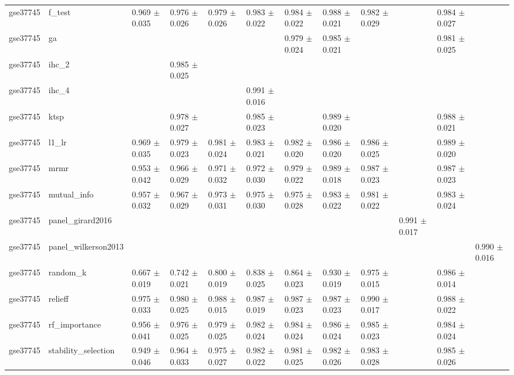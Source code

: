 \begin{table}[t]
\begin{tabular}{llllllllllll}
    gse37745 & f\_test & 0.969 $\pm$ 0.035 & 0.976 $\pm$ 0.026 & 0.979 $\pm$ 0.026 & 0.983 $\pm$ 0.022 & 0.984 $\pm$ 0.022 & 0.988 $\pm$ 0.021 & 0.982 $\pm$ 0.029 &  & 0.984 $\pm$ 0.027 &  \\
    gse37745 & ga &  &  &  &  & 0.979 $\pm$ 0.024 & 0.985 $\pm$ 0.021 &  &  & 0.981 $\pm$ 0.025 &  \\
    gse37745 & ihc\_2 &  & 0.985 $\pm$ 0.025 &  &  &  &  &  &  &  &  \\
    gse37745 & ihc\_4 &  &  &  & 0.991 $\pm$ 0.016 &  &  &  &  &  &  \\
    gse37745 & ktsp &  & 0.978 $\pm$ 0.027 &  & 0.985 $\pm$ 0.023 &  & 0.989 $\pm$ 0.020 &  &  & 0.988 $\pm$ 0.021 &  \\
    gse37745 & l1\_lr & 0.969 $\pm$ 0.035 & 0.979 $\pm$ 0.023 & 0.981 $\pm$ 0.024 & 0.983 $\pm$ 0.021 & 0.982 $\pm$ 0.020 & 0.986 $\pm$ 0.020 & 0.986 $\pm$ 0.025 &  & 0.989 $\pm$ 0.020 &  \\
    gse37745 & mrmr & 0.953 $\pm$ 0.042 & 0.966 $\pm$ 0.029 & 0.971 $\pm$ 0.032 & 0.972 $\pm$ 0.030 & 0.979 $\pm$ 0.022 & 0.989 $\pm$ 0.018 & 0.987 $\pm$ 0.023 &  & 0.987 $\pm$ 0.023 &  \\
    gse37745 & mutual\_info & 0.957 $\pm$ 0.032 & 0.967 $\pm$ 0.029 & 0.973 $\pm$ 0.031 & 0.975 $\pm$ 0.030 & 0.975 $\pm$ 0.028 & 0.983 $\pm$ 0.022 & 0.981 $\pm$ 0.022 &  & 0.983 $\pm$ 0.024 &  \\
    gse37745 & panel\_girard2016 &  &  &  &  &  &  &  & 0.991 $\pm$ 0.017 &  &  \\
    gse37745 & panel\_wilkerson2013 &  &  &  &  &  &  &  &  &  & 0.990 $\pm$ 0.016 \\
    gse37745 & random\_k & 0.667 $\pm$ 0.019 & 0.742 $\pm$ 0.021 & 0.800 $\pm$ 0.019 & 0.838 $\pm$ 0.025 & 0.864 $\pm$ 0.023 & 0.930 $\pm$ 0.019 & 0.975 $\pm$ 0.015 &  & 0.986 $\pm$ 0.014 &  \\
    gse37745 & relieff & 0.975 $\pm$ 0.033 & 0.980 $\pm$ 0.025 & 0.988 $\pm$ 0.015 & 0.987 $\pm$ 0.019 & 0.987 $\pm$ 0.023 & 0.987 $\pm$ 0.023 & 0.990 $\pm$ 0.017 &  & 0.988 $\pm$ 0.022 &  \\
    gse37745 & rf\_importance & 0.956 $\pm$ 0.041 & 0.976 $\pm$ 0.025 & 0.979 $\pm$ 0.025 & 0.982 $\pm$ 0.024 & 0.984 $\pm$ 0.024 & 0.986 $\pm$ 0.024 & 0.985 $\pm$ 0.023 &  & 0.984 $\pm$ 0.024 &  \\
    gse37745 & stability\_selection & 0.949 $\pm$ 0.046 & 0.964 $\pm$ 0.033 & 0.975 $\pm$ 0.027 & 0.982 $\pm$ 0.022 & 0.981 $\pm$ 0.025 & 0.982 $\pm$ 0.026 & 0.983 $\pm$ 0.028 &  & 0.985 $\pm$ 0.026 &  \\

\end{tabular}
\end{table}
